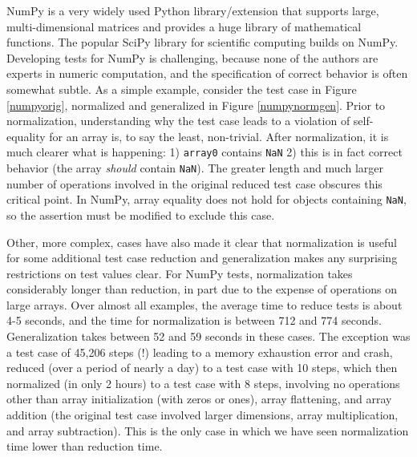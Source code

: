 NumPy \cite{NumPy} is a very widely used Python library/extension that supports
large, multi-dimensional matrices and provides a huge library of
mathematical functions.  The popular SciPy library for scientific
computing builds on NumPy.  Developing tests for NumPy is challenging,
because none of the authors are experts in numeric computation, and
the specification of correct behavior is often somewhat subtle.  As a
simple example, consider the test case in Figure \ref{numpyorig},
normalized and generalized in Figure \ref{numpynormgen}.  Prior to
normalization, understanding why the test case leads to a violation of
self-equality for an array is, to say the least, non-trivial.  After
normalization, it is much clearer what is happening:
1) {\tt array0} contains {\tt NaN} 2) this is in fact correct
behavior (the array \emph{should} contain {\tt NaN}).  The greater
length and much larger number of operations involved in the original
reduced test case obscures this critical point.  In NumPy, array
equality does not hold for objects containing {\tt NaN}, so the
assertion must be modified to exclude this case.

Other, more complex, cases have also made it clear that normalization
is useful for some additional test case reduction and generalization
makes any surprising restrictions on test values clear.  For NumPy
tests, normalization takes considerably longer than reduction, in part
due to the expense of operations on large arrays.  Over almost all
examples, the average time to reduce tests is about 4-5 seconds, and
the time for normalization is between 712 and 774 seconds.
Generalization takes between 52 and 59 seconds in these cases.  The
exception was a test case of 45,206 steps (!) leading to a memory
exhaustion error and crash, reduced (over a period of nearly a day) to
a test case with 10 steps, which then normalized (in only 2 hours)
to a test case with 8 steps, involving no operations other than array
initialization (with zeros or ones), array flattening, and array
addition (the original test case involved larger dimensions, array
multiplication, and array subtraction).  This is the only case in
which we have seen normalization time lower than reduction time.

